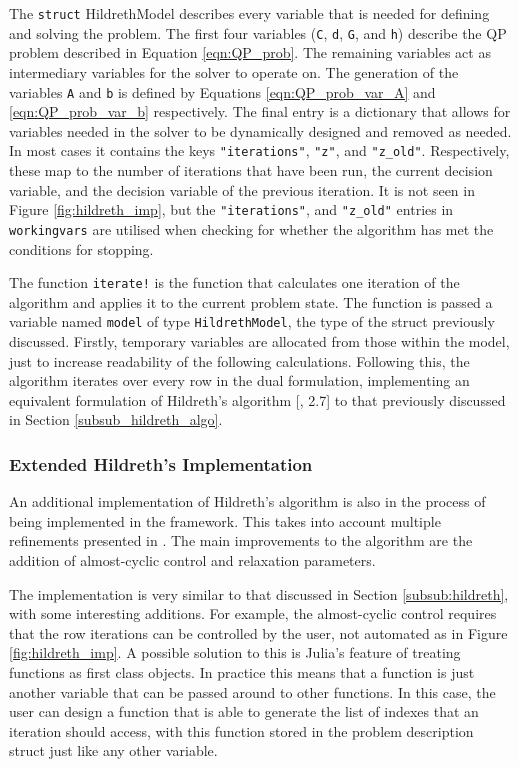 The \texttt{struct} HildrethModel describes every variable that is needed for defining and solving the problem. The first four variables (\texttt{C}, \texttt{d}, \texttt{G}, and \texttt{h}) describe the QP problem described in Equation \ref{eqn:QP_prob}. The remaining variables act as intermediary variables for the solver to operate on. The generation of the variables \texttt{A} and \texttt{b} is defined by Equations \ref{eqn:QP_prob_var_A} and \ref{eqn:QP_prob_var_b} respectively. The final entry is a dictionary that allows for variables needed in the solver to be dynamically designed and removed as needed. In most cases it contains the keys \texttt{"iterations"}, \texttt{"z"}, and \texttt{"z\_old"}. Respectively, these map to the number of iterations that have been run, the current decision variable, and the decision variable of the previous iteration. It is not seen in Figure \ref{fig:hildreth_imp}, but the \texttt{"iterations"}, and \texttt{"z\_old"} entries in \texttt{workingvars} are utilised when checking for whether the algorithm has met the conditions for stopping.

The function \texttt{iterate!} is the function that calculates one iteration of the algorithm and applies it to the current problem state. The function is passed a variable named \texttt{model} of type \texttt{HildrethModel}, the type of the struct previously discussed. Firstly, temporary variables are allocated from those within the model, just to increase readability of the following calculations. Following this, the algorithm iterates over every row in the dual formulation, implementing an equivalent formulation of Hildreth's algorithm [\cite{Lents1980EXTENSIONSPROGRAMMING}, 2.7] to that previously discussed in Section \ref{subsub_hildreth_algo}.

\subsubsection{Extended Hildreth's Implementation}
An additional implementation of Hildreth's algorithm is also in the process of being implemented in the framework. This takes into account multiple refinements presented in \cite{Lents1980EXTENSIONSPROGRAMMING}. The main improvements to the algorithm are the addition of almost-cyclic control and relaxation parameters.

The implementation is very similar to that discussed in Section \ref{subsub:hildreth}, with some interesting additions. For example, the almost-cyclic control requires that the row iterations can be controlled by the user, not automated as in Figure \ref{fig:hildreth_imp}. A possible solution to this is Julia's feature of treating functions as first class objects. In practice this means that a function is just another variable that can be passed around to other functions. In this case, the user can design a function that is able to generate the list of indexes that an iteration should access, with this function stored in the problem description struct just like any other variable.

